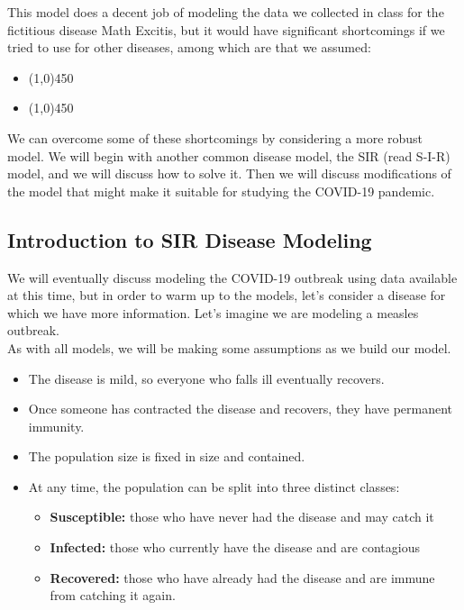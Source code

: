\documentclass[12pt]{article}
\newcommand{\<}{\langle}
\renewcommand{\>}{\rangle}
\begin{document}
\noindent  This model does a decent job of modeling the data we collected in class for the fictitious
disease Math Excitis, but it would have significant shortcomings if we tried to use for other diseases,
among which are that we assumed:
	\begin{itemize}
	\item  \line(1,0){450}
	\item  \line(1,0){450} 
	\end{itemize}

\noindent  We can overcome some of these shortcomings by considering a more robust model.  We will
begin with another common disease model, the SIR (read S-I-R) model, and we will discuss how to solve it.
Then we will discuss modifications of the model that might make it suitable for studying the COVID-19
pandemic. \\ \vspace{1cm}

\subsection*{Introduction to SIR Disease Modeling}

\noindent  We will eventually discuss modeling the COVID-19 outbreak using data available at this time,
but in order to warm up to the models, let's consider a disease for which we have more information. 
Let's imagine we are modeling a measles outbreak.\\

\noindent  As with all models, we will be making some assumptions as we build our model.
	\begin{itemize}
	\item  The disease is mild, so everyone who falls ill eventually recovers.
	\item  Once someone has contracted the disease and recovers, they have permanent immunity.
	\item  The population size is fixed in size and contained.
	\item  At any time, the population can be split into three distinct classes:
		\begin{itemize}
		\item  {\bf Susceptible:}  those who have never had the disease and may catch it
		\item  {\bf Infected:}  those who currently have the disease and are contagious
		\item  {\bf Recovered:}  those who have already had the disease and are immune from
			catching it again.\\
		\end{itemize}
	\end{itemize}
\end{document}
